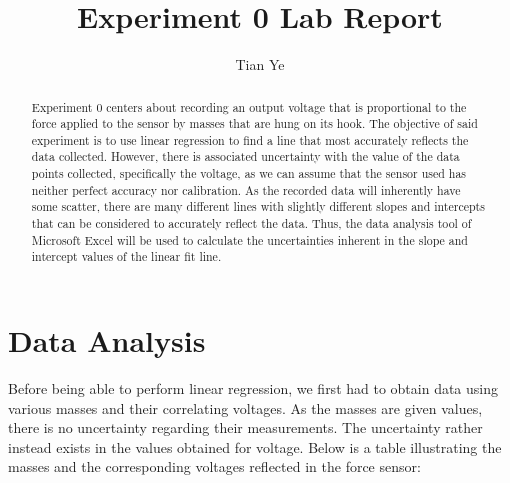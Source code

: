 \documentclass[titlepage]{article}
\begin{document}
\title{Experiment 0 Lab Report}
\author{Tian Ye}

\maketitle

\begin{abstract}
Experiment 0 centers about recording an output voltage that is proportional to the force applied to the sensor by masses that are hung on its hook. The objective of said experiment is to use linear regression to find a line that most accurately reflects the data collected.
	However, there is associated uncertainty with the value of the data points collected, specifically the voltage, as we can assume that the sensor used has neither perfect accuracy nor calibration. As the recorded data will inherently have some scatter, there are many different lines with slightly different slopes and intercepts that can be considered to accurately reflect the data.
	Thus, the data analysis tool of Microsoft Excel will be used to calculate the uncertainties inherent in the slope and intercept values of the linear fit line.
\end{abstract}

\section{Data Analysis}
Before being able to perform linear regression, we first had to obtain data using various masses and their correlating voltages. As the masses are given values, there is no uncertainty regarding their measurements. The uncertainty rather instead exists in the values obtained for voltage. Below is a table illustrating the masses and the corresponding voltages reflected in the force sensor:
\end{document}
